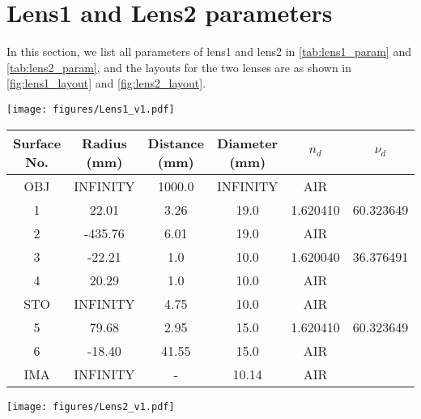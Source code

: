 \section{Lens1 and Lens2 parameters}
In this section, we list all parameters of lens1 and lens2 in \cref{tab:lens1_param} and \cref{tab:lens2_param}, and the layouts for the two lenses are as shown in \cref{fig:lens1_layout} and \cref{fig:lens2_layout}.

\begin{figure*}[tb]
\centering
  \texttt{[image: figures/Lens1\_v1.pdf]}
  \caption{Lens1 layout.} 
  \label{fig:lens1_layout}
\end{figure*}

\begin{table*}
\centering
\caption{The lens1 parameters used in our paper.}
\label{tab:lens1_param}
\begin{tabular}{cccccc}
\toprule
Surface No. & Radius (mm) & Distance (mm) & Diameter (mm) & $n_d$ & $\nu_d$ \\
\toprule
OBJ & INFINITY & 1000.0 & INFINITY & AIR &  \\
1 & 22.01 & 3.26 & 19.0 & 1.620410 & 60.323649 \\
2 & -435.76 & 6.01 & 19.0 & AIR & \\
3 & -22.21 & 1.0 & 10.0 & 1.620040 & 36.376491 \\
4 & 20.29 & 1.0 & 10.0 & AIR & \\
STO & INFINITY & 4.75 & 10.0 & AIR & \\
5 & 79.68 & 2.95 & 15.0 & 1.620410 & 60.323649 \\
6 & -18.40 & 41.55 & 15.0 & AIR & \\
IMA & INFINITY & - & 10.14 & AIR & \\
\bottomrule
\end{tabular}
\end{table*}

\begin{figure*}[tb]
\centering
  \texttt{[image: figures/Lens2\_v1.pdf]}
  \caption{Lens2 layout.} 
  \label{fig:lens2_layout}
\end{figure*}

